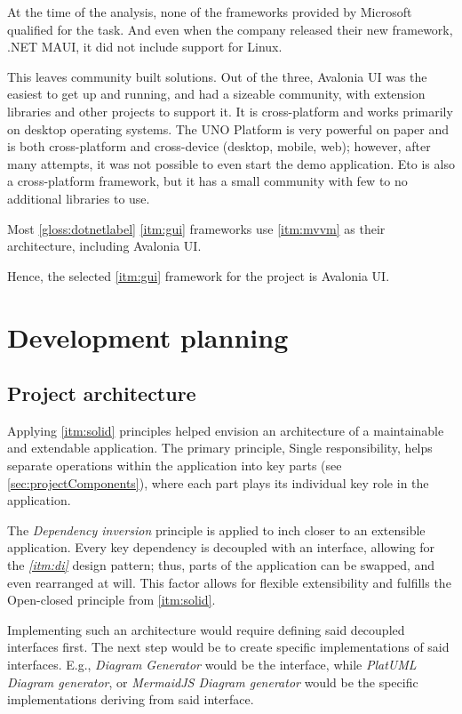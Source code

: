 At the time of the analysis, none of the frameworks provided by Microsoft qualified for the task. And even when the company released their new framework, .NET MAUI, it did not include support for Linux.

This leaves community built solutions.
Out of the three, Avalonia UI was the easiest to get up and running, and had a sizeable community, with extension libraries and other projects to support it. It is cross-platform and works primarily on desktop operating systems. The UNO Platform is very powerful on paper and is both cross-platform and cross-device (desktop, mobile, web); however, after many attempts, it was not possible to even start the demo application. Eto is also a cross-platform framework, but it has a small community with few to no additional libraries to use.

Most \ref{gloss:dotnetlabel} \ref{itm:gui} frameworks use \ref{itm:mvvm} as their architecture, including Avalonia UI.

Hence, the selected \ref{itm:gui} framework for the project is Avalonia UI.

\section{Development planning}

\subsection{Project architecture} \label{sec:projectArchitecture}

Applying \ref{itm:solid} principles helped envision an architecture of a maintainable and extendable application.
The primary principle, Single responsibility, helps separate operations within the application into key parts (see \ref{sec:projectComponents}), where each part plays its individual key role in the application.

The \textit{Dependency inversion} principle is applied to inch closer to an extensible application. Every key dependency is decoupled with an interface, allowing for the \textit{\ref{itm:di}} design pattern; thus, parts of the application can be swapped, and even rearranged at will. This factor allows for flexible extensibility and fulfills the Open-closed principle from \ref{itm:solid}.

Implementing such an architecture would require defining said decoupled interfaces first.
The next step would be to create specific implementations of said interfaces. E.g., \textit{Diagram Generator} would be the interface, while \textit{PlatUML Diagram generator}, or \textit{MermaidJS Diagram generator} would be the specific implementations deriving from said interface.

